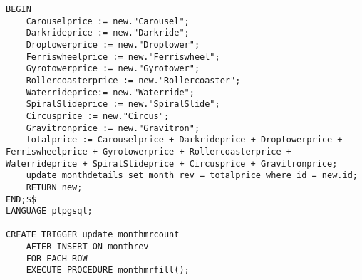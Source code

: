 \begin{verbatim}
BEGIN
    Carouselprice := new."Carousel";
    Darkrideprice := new."Darkride";
    Droptowerprice := new."Droptower";
    Ferriswheelprice := new."Ferriswheel";
    Gyrotowerprice := new."Gyrotower";
    Rollercoasterprice := new."Rollercoaster";
    Waterrideprice:= new."Waterride";
    SpiralSlideprice := new."SpiralSlide";
    Circusprice := new."Circus";
    Gravitronprice := new."Gravitron";
    totalprice := Carouselprice + Darkrideprice + Droptowerprice + Ferriswheelprice + Gyrotowerprice + Rollercoasterprice + Waterrideprice + SpiralSlideprice + Circusprice + Gravitronprice;
    update monthdetails set month_rev = totalprice where id = new.id;
    RETURN new;
END;$$
LANGUAGE plpgsql;

CREATE TRIGGER update_monthmrcount
    AFTER INSERT ON monthrev
    FOR EACH ROW
    EXECUTE PROCEDURE monthmrfill();
\end{verbatim}
